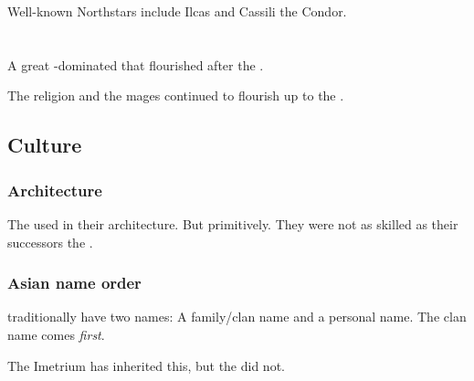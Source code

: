 Well-known Northstars include Ilcas and Cassili the Condor. 
























\chapter{\Ortaica}
\index{\Ortaica}
A great -dominated  that flourished after the . 

The \Ortaican religion and the \rethyax mages continued to flourish up to the \thirdbanewar. 









\section{Culture}





\subsection{Architecture}
The \Ortaicans{} used  in their architecture. 
But primitively.
They were not as skilled as their successors the . 





\subsection{Asian name order}
\Ortaican{} traditionally have two names: 
A family/clan name and a personal name. 
The clan name comes \emph{first}. 

The Imetrium has inherited this, but the  did not. 




